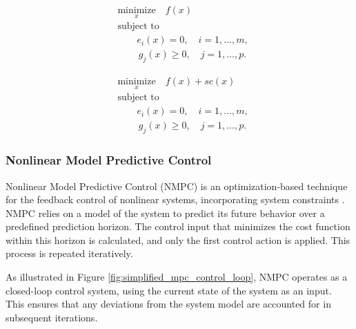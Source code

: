\begin{minipage}[t]{0.45\textwidth}
    \begin{equation}
        \begin{aligned}
            &\underset{x}{\text{minimize}} \quad f(x) \\
            &\text{subject to }  \\
            &\quad \quad e_i(x) = 0, \quad i = 1, \dots, m, \\
            &\quad \quad \, g_j(x) \geq 0, \quad j = 1, \dots, p.
        \end{aligned}
        \label{eq:optimization_problem}
    \end{equation}
\end{minipage}%
\hfill
\begin{minipage}[t]{0.45\textwidth}
    \begin{equation}
        \begin{aligned}
            &\underset{x}{\text{minimize}} \quad f(x) + sc(x) \\
            &\text{subject to}\\
            &\quad \quad e_i(x) = 0, \quad i = 1, \dots, m, \\
            &\quad \quad \, g_j(x) \geq 0, \quad j = 1, \dots, p.
        \end{aligned}
        \label{eq:optimization_problem_with_soft_constraint}
    \end{equation}
\end{minipage}

\subsubsection{Nonlinear Model Predictive Control}

Nonlinear Model Predictive Control (NMPC) is an optimization-based technique for the feedback control of nonlinear systems, incorporating system constraints \cite{grune2017nonlinearmpc}. NMPC relies on a model of the system to predict its future behavior over a predefined prediction horizon. The control input that minimizes the cost function within this horizon is calculated, and only the first control action is applied. This process is repeated iteratively.

As illustrated in Figure \ref{fig:simplified_mpc_control_loop}, NMPC operates as a closed-loop control system, using the current state of the system as an input. This ensures that any deviations from the system model are accounted for in subsequent iterations.

